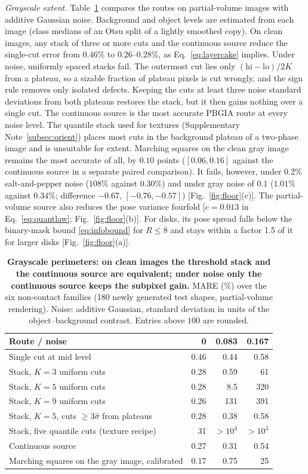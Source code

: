 \documentclass[11pt,a4paper]{article}
\begin{document}
\emph{Grayscale extent.} Table~\ref{tab:graycut} compares the routes on partial-volume images with additive Gaussian noise. Background and object levels are estimated from each image (class medians of an Otsu split of a lightly smoothed copy). On clean images, any stack of three or more cuts and the continuous source reduce the single-cut error from $0.46\%$ to $0.26$--$0.28\%$, as Eq.~\eqref{eq:layercake} implies. Under noise, uniformly spaced stacks fail. The outermost cut lies only $(\mathrm{hi}-\mathrm{lo})/2K$ from a plateau, so a sizable fraction of plateau pixels is cut wrongly, and the sign rule removes only isolated defects. Keeping the cuts at least three noise standard deviations from both plateaus restores the stack, but it then gains nothing over a single cut. The continuous source is the most accurate PBGIA route at every noise level. The quantile stack used for textures (Supplementary Note~\ref{subsec:orient}) places most cuts in the background plateau of a two-phase image and is unsuitable for extent. Marching squares on the clean gray image remains the most accurate of all, by $0.10$ points ($[0.06,0.16]$ against the continuous source in a separate paired comparison). It fails, however, under $0.2\%$ salt-and-pepper noise ($108\%$ against $0.30\%$) and under gray noise of $0.1$ ($1.01\%$ against $0.34\%$; difference $-0.67$, $[-0.76,-0.57]$) [Fig.~\ref{fig:floor}(c)]. The partial-volume source also reduces the pose variance fourfold [$c=0.013$ in Eq.~\eqref{eq:quantlaw}; Fig.~\ref{fig:floor}(b)]. For disks, its pose spread falls below the binary-mask bound \eqref{eq:infobound} for $R\le8$ and stays within a factor 1.5 of it for larger disks [Fig.~\ref{fig:floor}(a)].

\begin{table}[h]
\centering\caption{\textbf{Grayscale perimeters: on clean images the threshold stack and the continuous source are equivalent; under noise only the continuous source keeps the subpixel gain.} MARE (\%) over the six non-contact families (180 newly generated test shapes, partial-volume rendering). Noise: additive Gaussian, standard deviation in units of the object--background contrast. Entries above $100$ are rounded.}\label{tab:graycut}
\small\begin{tabular}{@{}lrrr@{}}\toprule
Route / noise & 0 & 0.083 & 0.167\\\midrule
Single cut at mid level & 0.46 & 0.44 & 0.58\\
Stack, $K=3$ uniform cuts & 0.28 & 0.59 & 61\\
Stack, $K=5$ uniform cuts & 0.28 & 8.5 & 320\\
Stack, $K=9$ uniform cuts & 0.26 & 131 & 391\\
Stack, $K=5$, cuts $\ge3\hat\sigma$ from plateaus & 0.28 & 0.38 & 0.58\\
Stack, five quantile cuts (texture recipe) & 31 & $>10^3$ & $>10^3$\\
Continuous source & 0.27 & 0.31 & 0.54\\
Marching squares on the gray image, calibrated & 0.17 & 0.75 & 25\\\bottomrule
\end{tabular}
\end{table}
\end{document}
